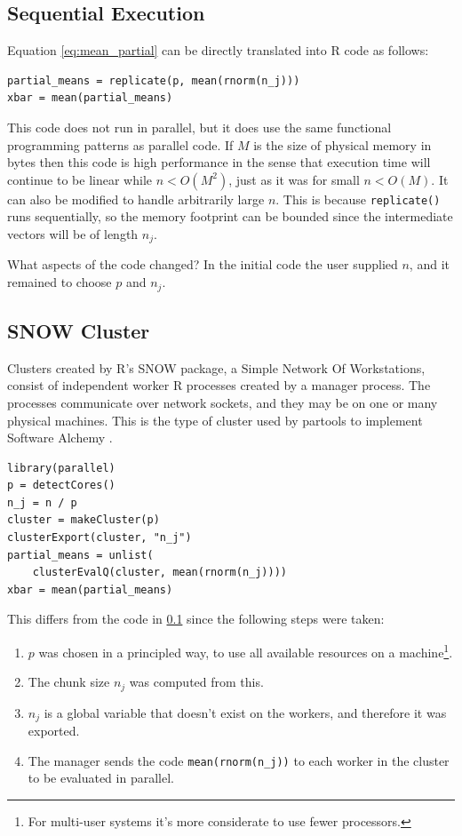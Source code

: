 \documentclass[12pt]{article}
\begin{document}
\subsection{Sequential Execution}
\label{section:sequential}

Equation \ref{eq:mean_partial} can be directly translated into R code as
follows:

\begin{verbatim}
partial_means = replicate(p, mean(rnorm(n_j)))
xbar = mean(partial_means)
\end{verbatim}

This code does not run in parallel, but it does use the same functional
programming patterns as parallel code. If $M$ is the size of physical memory in
bytes then this code is high performance in the sense
that execution time will continue to be linear while $n < O(M^2)$, just
as it was for small $n < O(M)$. It can also be modified to handle
arbitrarily large $n$. This is because \texttt{replicate()} runs
sequentially, so the memory footprint can be bounded since the intermediate
vectors will be of length $n_j$. 

What aspects of the code changed? In the initial code the user
supplied $n$, and it remained to choose $p$ and $n_j$.

\subsection{SNOW Cluster}

Clusters created by R's SNOW package, a Simple Network Of Workstations,
consist of independent worker R processes created by a manager process. The
processes communicate over network sockets, and they may be on one or many
physical machines.  This is the type of cluster used by partools to
implement Software Alchemy \cite{R-partools} \cite{matloff2014software}.  

\begin{verbatim}
library(parallel)
p = detectCores()
n_j = n / p
cluster = makeCluster(p)
clusterExport(cluster, "n_j")
partial_means = unlist(
    clusterEvalQ(cluster, mean(rnorm(n_j))))
xbar = mean(partial_means)
\end{verbatim}

This differs from the code in \ref{section:sequential} since
the following steps were taken:
\begin{enumerate}
    \item $p$ was chosen in a principled way, to use all available
        resources on a machine\footnote{For multi-user systems it's more
        considerate to use fewer processors.}. 
    \item The chunk size $n_j$ was computed from this.
    \item $n_j$ is a global variable that doesn't exist on
        the workers, and therefore it was exported.
    \item The manager sends the code \texttt{mean(rnorm(n\_j))} to each
        worker in the cluster to be evaluated in parallel. 
\end{enumerate}
\end{document}
